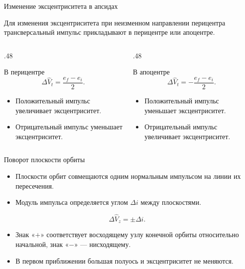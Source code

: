 \documentclass[11pt,aspectratio=169,t]{beamer}
\begin{document}
\begin{frame}{Изменение эксцентриситета в апсидах}
\relax
{\justifying
Для изменения эксцентриситета при неизменном направлении перицентра трансверсальный импульс прикладывают в перицентре или апоцентре.\par}
\smallskip
\begin{columns}[T,onlytextwidth]
\begin{column}{.48\textwidth}
\begin{block}{В перицентре}
\[
 \Delta\widehat V_t=\frac{e_f-e_i}{2}.
\]
\begin{itemize}
 \setlength{\itemsep}{3pt}
 \item Положительный импульс увеличивает эксцентриситет.
 \item Отрицательный импульс уменьшает эксцентриситет.
\end{itemize}
\end{block}
\end{column}
\begin{column}{.48\textwidth}
\begin{block}{В апоцентре}
\[
 \Delta\widehat V_t=-\frac{e_f-e_i}{2}.
\]
\begin{itemize}
 \setlength{\itemsep}{3pt}
 \item Положительный импульс уменьшает эксцентриситет.
 \item Отрицательный импульс увеличивает эксцентриситет.
\end{itemize}
\end{block}
\end{column}
\end{columns}
\end{frame}

\begin{frame}{Поворот плоскости орбиты}
\relax
\begin{itemize}
 \setlength{\itemsep}{8pt}
 \item Плоскости орбит совмещаются одним нормальным импульсом на линии их пересечения.
 \item Модуль импульса определяется углом $\Delta i$ между плоскостями.
\end{itemize}
\medskip
\[
 \boxed{\Delta\widehat V_z=\pm\Delta i.}
\]
\medskip
\begin{itemize}
 \setlength{\itemsep}{8pt}
 \item Знак «$+$» соответствует восходящему узлу конечной орбиты относительно начальной, знак «$-$» — нисходящему.
 \item В первом приближении большая полуось и эксцентриситет не меняются.
\end{itemize}
\end{frame}
\end{document}
